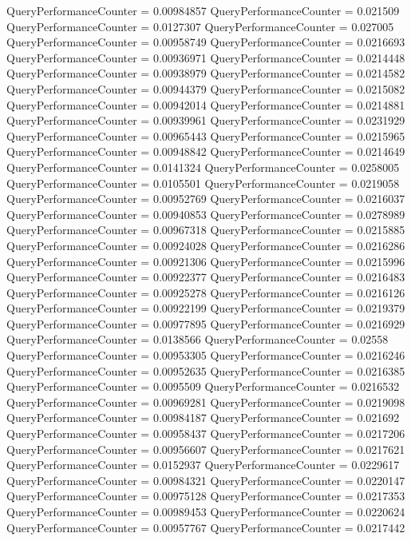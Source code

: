 \documentclass[9pt]{article}
\theoremstyle{plain}
\theoremstyle{definition}
\theoremstyle{remark}
\numberwithin{equation}{section}
\begin{document}
QueryPerformanceCounter  =  0.00984857
QueryPerformanceCounter  =  0.021509
QueryPerformanceCounter  =  0.0127307
QueryPerformanceCounter  =  0.027005
QueryPerformanceCounter  =  0.00958749
QueryPerformanceCounter  =  0.0216693
QueryPerformanceCounter  =  0.00936971
QueryPerformanceCounter  =  0.0214448
QueryPerformanceCounter  =  0.00938979
QueryPerformanceCounter  =  0.0214582
QueryPerformanceCounter  =  0.00944379
QueryPerformanceCounter  =  0.0215082
QueryPerformanceCounter  =  0.00942014
QueryPerformanceCounter  =  0.0214881
QueryPerformanceCounter  =  0.00939961
QueryPerformanceCounter  =  0.0231929
QueryPerformanceCounter  =  0.00965443
QueryPerformanceCounter  =  0.0215965
QueryPerformanceCounter  =  0.00948842
QueryPerformanceCounter  =  0.0214649
QueryPerformanceCounter  =  0.0141324
QueryPerformanceCounter  =  0.0258005
QueryPerformanceCounter  =  0.0105501
QueryPerformanceCounter  =  0.0219058
QueryPerformanceCounter  =  0.00952769
QueryPerformanceCounter  =  0.0216037
QueryPerformanceCounter  =  0.00940853
QueryPerformanceCounter  =  0.0278989
QueryPerformanceCounter  =  0.00967318
QueryPerformanceCounter  =  0.0215885
QueryPerformanceCounter  =  0.00924028
QueryPerformanceCounter  =  0.0216286
QueryPerformanceCounter  =  0.00921306
QueryPerformanceCounter  =  0.0215996
QueryPerformanceCounter  =  0.00922377
QueryPerformanceCounter  =  0.0216483
QueryPerformanceCounter  =  0.00925278
QueryPerformanceCounter  =  0.0216126
QueryPerformanceCounter  =  0.00922199
QueryPerformanceCounter  =  0.0219379
QueryPerformanceCounter  =  0.00977895
QueryPerformanceCounter  =  0.0216929
QueryPerformanceCounter  =  0.0138566
QueryPerformanceCounter  =  0.02558
QueryPerformanceCounter  =  0.00953305
QueryPerformanceCounter  =  0.0216246
QueryPerformanceCounter  =  0.00952635
QueryPerformanceCounter  =  0.0216385
QueryPerformanceCounter  =  0.0095509
QueryPerformanceCounter  =  0.0216532
QueryPerformanceCounter  =  0.00969281
QueryPerformanceCounter  =  0.0219098
QueryPerformanceCounter  =  0.00984187
QueryPerformanceCounter  =  0.021692
QueryPerformanceCounter  =  0.00958437
QueryPerformanceCounter  =  0.0217206
QueryPerformanceCounter  =  0.00956607
QueryPerformanceCounter  =  0.0217621
QueryPerformanceCounter  =  0.0152937
QueryPerformanceCounter  =  0.0229617
QueryPerformanceCounter  =  0.00984321
QueryPerformanceCounter  =  0.0220147
QueryPerformanceCounter  =  0.00975128
QueryPerformanceCounter  =  0.0217353
QueryPerformanceCounter  =  0.00989453
QueryPerformanceCounter  =  0.0220624
QueryPerformanceCounter  =  0.00957767
QueryPerformanceCounter  =  0.0217442
\end{document}
